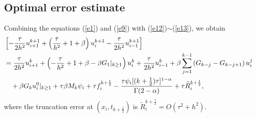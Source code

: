 \documentclass[3p,times]{elsarticle}
\begin{document}
\subsection{Optimal error estimate}
Combining the equations (\ref{e1}) and (\ref{e9}) with (\ref{e12})$\sim$(\ref{e13}), we obtain
\begin{equation}\label{e30}
\aligned
&\left[-\frac{\tau}{2h^2}u_{i+1}^{k+1}+\left(\frac{\tau}{h^2}+1+\beta\right)u_i^{k+1}-\frac{\tau}{2h^2}u_{i-1}^{k+1}\right]\\
&=\frac{\tau}{2h^2}u_{i+1}^{k}+\left(-\frac{\tau}{h^2}+1+\beta-\beta G_1|_{k\geq1}\right)u_i^{k}+\frac{\tau}{2h^2}u_{i-1}^{k}+\beta\sum\limits_{j=1}^{k-1}\left(G_{k-j}-G_{k-j+1}\right)u_i^j\\
&\quad+\beta G_ku_i^0|_{k\geq1}+\tau\beta M_k\psi_i+\tau f_i^{k+\frac{1}{2}}-\frac{\tau\psi_i[(k+\frac{1}{2})\tau]^{1-\alpha}}{\Gamma(2-\alpha)}+\tau\widetilde{R}_i^{k+\frac{1}{2}},
\endaligned
\end{equation}
where the truncation error at $(x_i,t_{k+\frac{1}{2}})$ is $\widetilde{R}_i^{k+\frac{1}{2}}=O(\tau^2+h^2)$.
\end{document}
